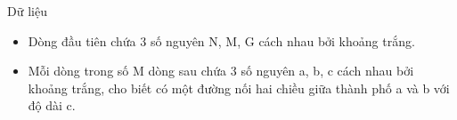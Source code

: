 Dữ liệu
\begin{itemize}
	\item     Dòng đầu tiên chứa 3 số nguyên N, M, G cách nhau bởi khoảng trắng.   
	\item     Mỗi dòng trong số M dòng sau chứa 3 số nguyên a, b, c cách nhau bởi khoảng trắng, cho biết có một đường nối hai chiều giữa thành phố a và b với độ dài c.   
\end{itemize}